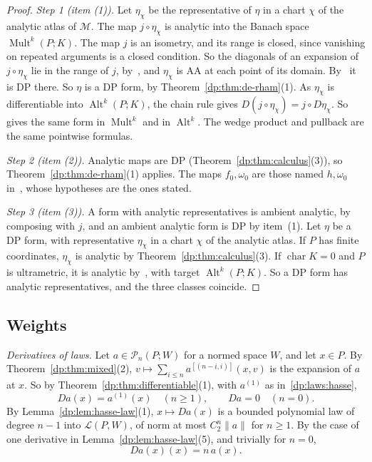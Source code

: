 \documentclass[11pt]{amsart}
\theoremstyle{definition}
\theoremstyle{remark}
\numberwithin{equation}{section}
\newcommand{\cL}{\mathcal L}
\newcommand{\Alt}{\operatorname{Alt}}
\newcommand{\Mult}{\operatorname{Mult}}
\newcommand{\norm}[1]{\lVert #1\rVert}
\theoremstyle{plain}
\theoremstyle{definition}
\theoremstyle{plain}
\newcommand{\cM}{\mathcal M}
\newcommand{\cP}{\mathcal P}
\begin{document}
\begin{proof}
\emph{Step 1 (item (1)).} Let $\eta_\chi$ be the representative of $\eta$ in a chart $\chi$ of the analytic atlas of $\cM$. The map $j\circ\eta_\chi$ is analytic into the Banach space $\Mult^k(P;K)$. The map $j$ is an isometry, and its range is closed, since vanishing on repeated arguments is a closed condition. So the diagonals of an expansion of $j\circ\eta_\chi$ lie in the range of $j$, by~\cite[Theorem~2.3]{I}, and $\eta_\chi$ is AA at each point of its domain. By~\cite[Proposition~14.9(1)]{I} it is DP there. So $\eta$ is a DP form, by Theorem~\ref{dp:thm:de-rham}(1). As $\eta_\chi$ is differentiable into $\Alt^k(P;K)$, the chain rule gives $D(j\circ\eta_\chi)=j\circ D\eta_\chi$. So~\cite[(10.3)]{I} gives the same form in $\Mult^k$ and in $\Alt^k$. The wedge product and pullback are the same pointwise formulas.

\emph{Step 2 (item (2)).} Analytic maps are DP (Theorem~\ref{dp:thm:calculus}(3)), so Theorem~\ref{dp:thm:de-rham}(1) applies. The maps $f_0,\omega_0$ are those named $h,\omega_0$ in~\cite[Proposition~10.3(2)]{I}, whose hypotheses are the ones stated.

\emph{Step 3 (item (3)).} A form with analytic representatives is ambient analytic, by composing with $j$, and an ambient analytic form is DP by item~(1). Let $\eta$ be a DP form, with representative $\eta_\chi$ in a chart $\chi$ of the analytic atlas. If $P$ has finite coordinates, $\eta_\chi$ is analytic by Theorem~\ref{dp:thm:calculus}(3). If $\operatorname{char}K=0$ and $P$ is ultrametric, it is analytic by~\cite[Proposition~14.40(2)]{I}, with target $\Alt^k(P;K)$. So a DP form has analytic representatives, and the three classes coincide.
\end{proof}

\subsection{Weights}\label{dp:ssec:weights}

\emph{Derivatives of laws.} Let $a\in\cP_n(P;W)$ for a normed space $W$, and let $x\in P$. By Theorem~\ref{dp:thm:mixed}(2), $v\mapsto\sum_{i\le n}a^{[(n-i,i)]}(x,v)$ is the expansion of $a$ at $x$. So by Theorem~\ref{dp:thm:differentiable}(1), with $a^{(1)}$ as in~\eqref{dp:laws:hasse},
\begin{equation}\label{dp:f:law-derivative}
 Da(x)=a^{(1)}(x)\quad(n\ge1),\qquad Da=0\quad(n=0).
\end{equation}
By Lemma~\ref{dp:lem:hasse-law}(1), $x\mapsto Da(x)$ is a bounded polynomial law of degree $n-1$ into $\cL(P,W)$, of norm at most $C_2^n\norm a$ for $n\ge1$. By the case of one derivative in Lemma~\ref{dp:lem:hasse-law}(5), and trivially for $n=0$,
\begin{equation}\label{dp:f:law-euler}
 Da(x)(x)=n\,a(x).
\end{equation}
\end{document}
